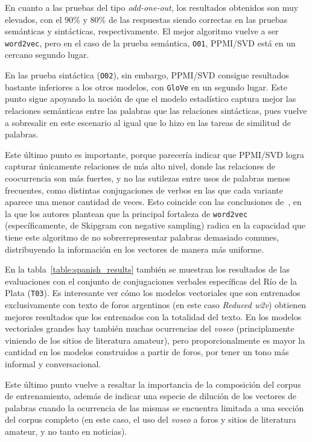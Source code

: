 En cuanto a las pruebas del tipo \textit{odd-one-out}, los resultados obtenidos son muy elevados,
con el $90\%$ y $80\%$ de las respuestas siendo correctas en las pruebas semánticas y sintácticas,
respectivamente. El mejor algoritmo vuelve a ser \texttt{word2vec}, pero en el caso de la prueba
semántica, \texttt{O01}, PPMI/SVD está en un cercano segundo lugar.

En las prueba sintáctica (\texttt{O02}), sin embargo, PPMI/SVD consigue resultados bastante
inferiores a los otros modelos, con \texttt{GloVe} en un segundo lugar. Este punto sigue apoyando la
noción de que el modelo estadístico captura mejor las relaciones semánticas entre las palabras que
las relaciones sintácticas, pues vuelve a sobresalir en este escenario al igual que lo hizo en las
tareas de similitud de palabras.

Este último punto es importante, porque parecería indicar que PPMI/SVD logra capturar únicamente
relaciones de más alto nivel, donde las relaciones de coocurrencia son más fuertes, y no las
sutilezas entre usos de palabras menos frecuentes, como distintas conjugaciones de verbos en las que
cada variante aparece una menor cantidad de veces. Esto coincide con las conclusiones
de~\cite{Levy2014a}, en la que los autores plantean que la principal fortaleza de \texttt{word2vec}
(específicamente, de Skipgram con negative sampling) radica en la capacidad que tiene este algoritmo
de no sobrerrepresentar palabras demasiado comunes, distribuyendo la información en los vectores de
manera más uniforme.


En la tabla~\ref{table:spanish_results} también se muestran los resultados de las evaluaciones con
el conjunto de conjugaciones verbales específicas del Río de la Plata (\texttt{T03}). Es interesante
ver cómo los modelos vectoriales que son entrenados exclusivamente con texto de foros argentinos (en
este caso \textit{Reduced w2v}) obtienen mejores resultados que los entrenados con la totalidad del
texto. En los modelos vectoriales grandes hay también muchas ocurrencias del \textit{voseo}
(principlamente viniendo de los sitios de literatura amateur), pero proporcionalmente es mayor la
cantidad en los modelos construidos a partir de foros, por tener un tono más informal y
conversacional.

Este último punto vuelve a resaltar la importancia de la composición del corpus de entrenamiento,
además de indicar una especie de dilución de los vectores de palabras cuando la ocurrencia de las
mismas se encuentra limitada a una sección del corpus completo (en este caso, el uso del
\textit{voseo} a foros y sitios de literatura amateur, y no tanto en noticias).


